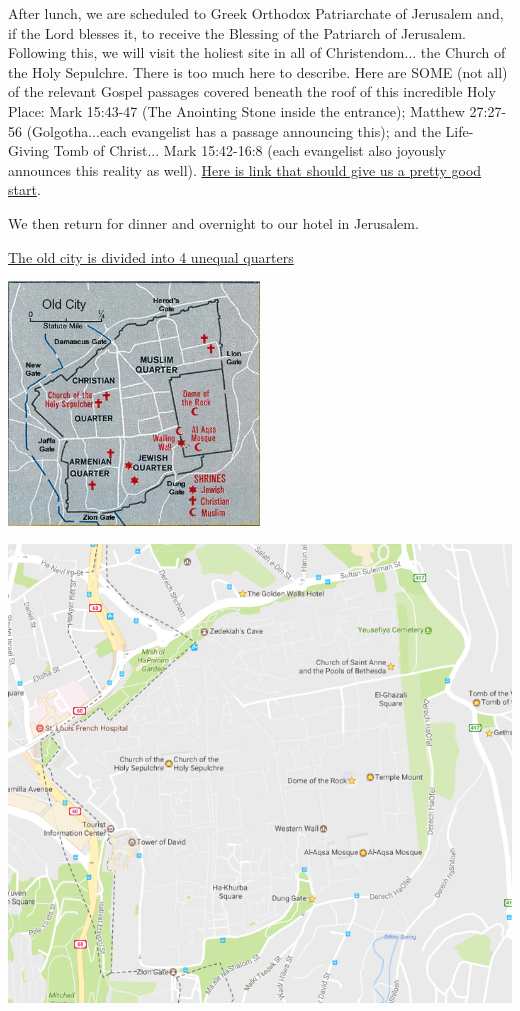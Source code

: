 \documentclass[letterpaper]{report}
\begin{document}
After lunch, we are scheduled to Greek Orthodox Patriarchate of Jerusalem and,
if the Lord blesses it, to receive the Blessing of the Patriarch of Jerusalem.
Following this, we will visit the holiest site in all of Christendom...
the Church of the Holy Sepulchre.
There is too much here to describe.
Here are SOME (not all) of the relevant Gospel passages covered beneath the 
roof of this incredible Holy Place:
Mark 15:43-47 (The Anointing Stone inside the entrance);
Matthew 27:27-56 (Golgotha...each evangelist has a passage announcing this); 
and the Life-Giving Tomb of Christ...
Mark 15:42-16:8
(each evangelist also joyously announces this reality as well).
\href{https://orthodoxwiki.org/Church_of_the_Holy_Sepulchre_(Jerusalem)}{
	Here is link that should give us a pretty good start}.

We then return for dinner and overnight to our hotel in Jerusalem.

\href{http://wikitravel.org/en/Jerusalem/Old_City}{
	The old city is divided into 4 unequal quarters}

\includegraphics[width=0.5\textwidth]{MapJerusalemOldCity}

\includegraphics[width=\textwidth]{OldJerusalem}
\end{document}
